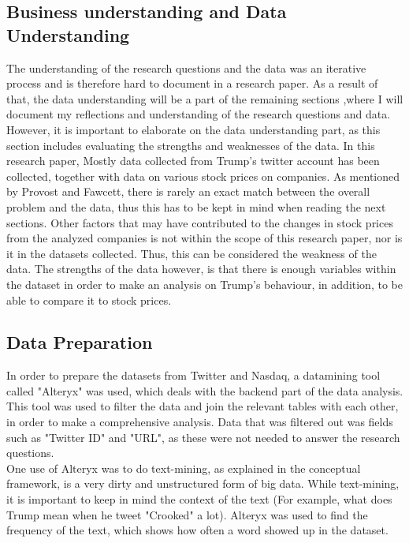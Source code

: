\documentclass[12pt]{article}
\begin{document}
\subsection{Business understanding and Data Understanding}
The understanding of the research questions and the data was an iterative process and is therefore hard to document in a research paper. As a result of that, the data understanding will be a part of the remaining sections ,where I will document my reflections and understanding of the research questions and data.  \\

However, it is important to elaborate on the data understanding part, as this section includes evaluating the strengths and weaknesses of the data. In this research paper, Mostly data collected from Trump's twitter account has been collected, together with data on various stock prices on companies.  As mentioned by Provost and Fawcett, there is rarely an exact match between the overall problem and the data, thus this has to be kept in mind when reading the next sections. Other factors that may have contributed to the changes in stock prices from the analyzed companies is not within the scope of this research paper, nor is it in the datasets collected. Thus, this can be considered the weakness of the data. The strengths of the data however, is that there is enough variables within the dataset in order to make an analysis on Trump's behaviour, in addition, to be able to compare it to stock prices.

\subsection{Data Preparation}
In order to prepare the datasets from Twitter and Nasdaq, a datamining tool called "Alteryx" was used, which deals with the backend part of the data analysis. This tool was used to filter the data and join the relevant tables with each other, in order to make a comprehensive analysis. Data that was filtered out was fields such as "Twitter ID" and "URL", as these were not needed to answer the research questions. \\

One use of Alteryx was to do text-mining, as explained in the conceptual framework, is a very dirty and unstructured form of big data. While text-mining, it is important to keep in mind the context of the text (For example, what does Trump mean when he tweet "Crooked" a lot). Alteryx was used to find the frequency of the text, which shows how often a word showed up in the dataset.  \\
\end{document}
